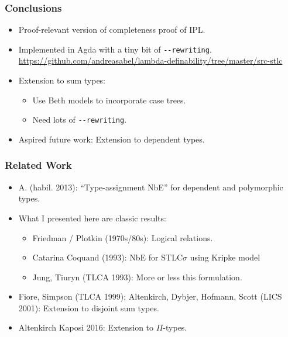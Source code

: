 \documentclass[t,fleqn,usenames,dvipsnames]{beamer}
\newcommand{\cAnn}{\color{red!80!black}}%
\renewcommand{\emph}[1]{{\cAnn#1}}
\newcommand{\cType}{\color{orange!60!black}}
\renewcommand{\emph}[1]{\textit{\cType#1}}
\begin{document}
\begin{frame}[fragile=singleslide]
  \frametitle{Conclusions}
  \vspace{-3ex}
  \begin{itemize}
  \item Proof-relevant version of completeness proof of IPL.
  \item Implemented in Agda with a tiny bit of \verb|--rewriting|.\\
  \url{https://github.com/andreasabel/lambda-definability/tree/master/src-stlc}
  \item Extension to sum types: %
    \begin{itemize}
    \item Use Beth models to incorporate case trees.
    \item Need lots of \verb|--rewriting|.
    \end{itemize}
  \item Aspired future work: Extension to dependent types.
  \end{itemize}
\end{frame}

\begin{frame}%
  \frametitle{Related Work}
  \begin{itemize}
  \item A. (habil. 2013): ``Type-assignment NbE'' for dependent and
    polymorphic types.
  \item What I presented here are classic results:
    \begin{itemize}
  \item Friedman / Plotkin (1970s/80s): Logical relations.
  \item Catarina Coquand (1993): NbE for STLC$\sigma$ using Kripke model
  \item Jung, Tiuryn (TLCA 1993): More or less this formulation.
    \end{itemize}
  \item Fiore, Simpson (TLCA 1999); Altenkirch, Dybjer, Hofmann, Scott
    (LICS 2001): Extension to disjoint sum types.
  \item Altenkirch Kaposi 2016: Extension to $\Pi$-types.
  \end{itemize}
\end{frame}





% 
\end{document}
